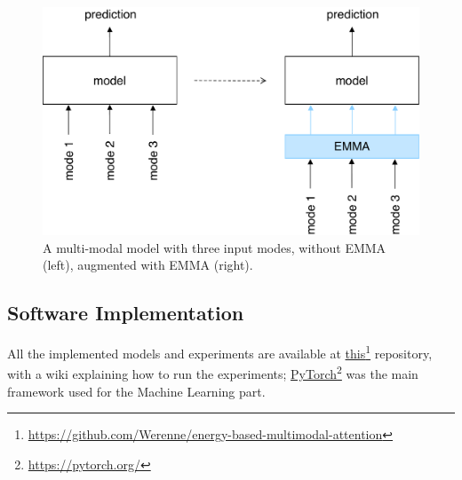 \begin{figure}[!h]
\centering
\includegraphics[scale=0.45]{figures/introduction-three-modes-with-emma}
\caption[Multi-Modal model with/without EMMA]{A multi-modal model with three input modes, without EMMA (left), augmented with EMMA (right).}	
\label{fig:main-idea}
\end{figure}

\subsection*{Software Implementation}
All the implemented models and experiments are available at \href{https://github.com/Werenne/energy-based-multimodal-attention}{this}\footnote{\url{https://github.com/Werenne/energy-based-multimodal-attention}} repository, with a wiki explaining how to run the experiments; \href{https://pytorch.org/}{PyTorch}\footnote{\url{https://pytorch.org/}} \citep{paszke} was the main framework used for the Machine Learning part.


